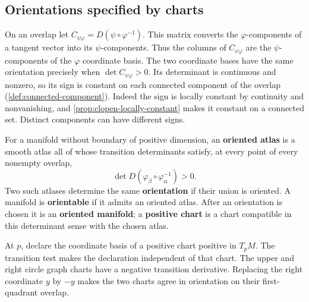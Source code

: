 \subsection{Orientations specified by charts}
On an overlap let $C_{\psi\varphi}=D(\psi\circ\varphi^{-1})$.
This matrix converts the $\varphi$-components of a tangent vector into
its $\psi$-components. Thus the columns of $C_{\psi\varphi}$ are the
$\psi$-components of the $\varphi$ coordinate basis. The two coordinate
bases have the same orientation precisely when $\det C_{\psi\varphi}>0$.
Its determinant is continuous and nonzero, so its sign is constant on
each connected component of the overlap (\cref{def:connected-component}).
Indeed the sign is locally constant by continuity and nonvanishing, and
\cref{prop:clopen-locally-constant} makes it constant on a connected set.
Distinct components can have
different signs.

\begin{definition}
For a manifold without boundary of positive dimension, an
\textbf{oriented atlas} is a smooth atlas all of whose transition
determinants satisfy, at every point of every nonempty overlap,
\[
\boxed{\det D(\varphi_\beta\circ\varphi_\alpha^{-1})>0.}
\]
Two such atlases determine the same
\textbf{orientation} if their union is oriented. A manifold is
\textbf{orientable} if it admits an oriented atlas. After an orientation
is chosen it is an \textbf{oriented manifold}; a \textbf{positive chart}
is a chart compatible in this determinant sense with the chosen atlas.
\end{definition}
At $p$, declare the coordinate basis of a positive chart positive in $T_pM$.
The transition test makes the declaration independent of that chart.
The upper and right circle graph charts have a negative transition
derivative. Replacing the right coordinate $y$ by $-y$ makes the two
charts agree in orientation on their first-quadrant overlap.

